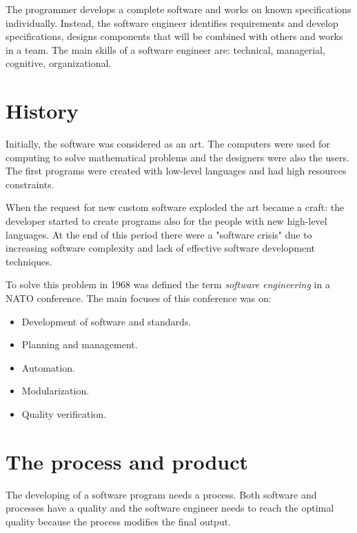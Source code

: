 \documentclass[12pt, a4paper]{report}
\newtheorem[style=M,bodystyle=\normalfont]{theorem}{Theorem}
\newtheorem[style=M,bodystyle=\normalfont]{corollary}{Corollary}
\newtheorem[style=M,bodystyle=\normalfont]{lemma}{Lemma}
\newtheorem[style=M,bodystyle=\normalfont]{definition}{Definition}
\begin{document}
    The programmer develops a complete software and works on known specifications individually. Instead, the software engineer 
    identifies requirements and develop specifications, designs components that will be combined with others and works in a team.
    The main skills of a software engineer are: technical, managerial, cognitive, organizational.

    \section{History}
    Initially, the software was considered as an art. The computers were used for computing to solve mathematical problems and 
    the designers were also the users. The first programs were created with low-level languages and had high resources constraints. 
    
    When the request for new custom software exploded the art became a craft: the developer started to create programs also 
    for the people with new high-level languages. At the end of this period there were a "software crisis" due to increasing software 
    complexity and lack of effective software development techniques. 
    
    To solve this problem in 1968 was defined the term \emph{software engineering} in a NATO conference. 
    The main focuses of this conference was on: 
    \begin{itemize}
        \item Development of software and standards.
        \item Planning and management.
        \item Automation.
        \item Modularization.
        \item Quality verification.
    \end{itemize}

    \section{The process and product}
    The developing of a software program needs a process. Both software and processes have a quality and the software engineer 
    needs to reach the optimal quality because the process modifies the final output.
    
\end{document}
